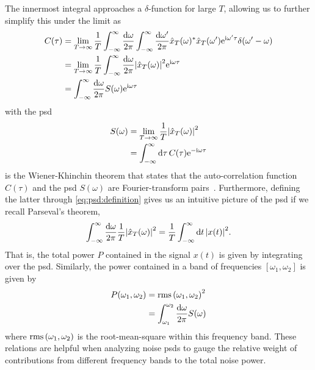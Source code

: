 The innermost integral approaches a $\delta$-function for large $T$,
allowing us to further simplify this under the limit as
\begin{align}
    C(\tau) &= \lim_{T\to\infty} \frac{1}{T}\int_{-\infty}^{\infty}\frac{\dd{\omega}}{2\pi}\int_{-\infty}^{\infty}\frac{\dd{\omega^\prime}}{2\pi}
                \hat{x}_T(\omega)^{\ast}\hat{x}_T(\omega^\prime)
                \mathrm{e}^{\mathrm{i}\omega^\prime\tau}\delta(\omega^\prime - \omega)\\
            &= \lim_{T\to\infty}\frac{1}{T}
                \int_{-\infty}^{\infty}\frac{\dd{\omega}}{2\pi}\abs{\hat{x}_T(\omega)}^2 \mathrm{e}^{\mathrm{i}\omega\tau} \\
            &= \int_{-\infty}^{\infty}\frac{\dd{\omega}}{2\pi} S(\omega) \mathrm{e}^{\mathrm{i}\omega\tau} \label{eq:wiener_khinchin}
\end{align}
with the \gls{psd}
\begin{align}
    S(\omega) &= \lim_{T\to\infty}\frac{1}{T}\abs{\hat{x}_T(\omega)}^2 \label{eq:psd:definition}\\
              &= \int_{-\infty}^{\infty}\dd{\tau} C(\tau)\mathrm{e}^{-\mathrm{i}\omega\tau}
\end{align}
 is the Wiener-Khinchin theorem that states that the auto-correlation function $C(\tau)$ and the \gls{psd} $S(\omega)$ are Fourier-transform pairs~\cite{Koopmans1995}.
Furthermore, defining the latter through \cref{eq:psd:definition} gives us an intuitive picture of the \gls{psd} if we recall Parseval's theorem,
\begin{align}\label{eq:parseval}
    \int_{-\infty}^{\infty}\frac{\dd{\omega}}{2\pi}\frac{1}{T}\abs{\hat{x}_T(\omega)}^2 = \frac{1}{T}\int_{-\infty}^{\infty}\dd{t}\abs{x(t)}^2.
\end{align}
That is, the total power $P$ contained in the signal $x(t)$ is given by integrating over the \gls{psd}.
Similarly, the power contained in a band of frequencies $[\omega_1, \omega_2]$ is given by
\begin{align}
    P(\omega_1, \omega_2) &= \operatorname{rms}\left(\omega_1, \omega_2\right)^2 \\
                          &= \int_{\omega_1}^{\omega_2}\frac{\dd{\omega}}{2\pi} S(\omega) \label{eq:psd:bandpower}
\end{align}
where $\operatorname{rms}\left(\omega_1, \omega_2\right)$ is the root-mean-square within this frequency band.
These relations are helpful when analyzing noise \glspl{psd} to gauge the relative weight of contributions from different frequency bands to the total noise power.

